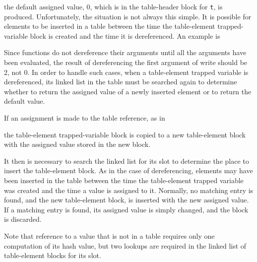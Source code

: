 
\noindent the default assigned value, 0, which is in the table-header
block for \texttt{t}, is produced. Unfortunately, the situation is not
always this simple. It is possible for elements to be inserted in a
table between the time the table-element trapped-variable block is
created and the time it is dereferenced. An example is


Since functions do not dereference their arguments until all the
arguments have been evaluated, the result of dereferencing the first
argument of write should be 2, not 0. In order to handle such cases,
when a table-element trapped variable is dereferenced, its linked list
in the table must be searched again to determine whether to return the
assigned value of a newly inserted element or to return the default
value.

If an assignment is made to the table reference, as in


\noindent the table-element trapped-variable block is copied to a new
table-element block with the assigned value stored in the new block.

It then is necessary to search the linked list for its slot to %
determine the place to insert the table-element block. As in the case
of dereferencing, elements may have been inserted in the table between
the time the table-element trapped variable was created and the time a
value is assigned to it. Normally, no matching entry is found, and the
new table-element
block, is inserted with the new assigned value.  If a matching entry
is found, its assigned value is simply changed, and the block is
discarded.

Note that reference to a value that is not in a table requires only
one computation of its hash value, but two lookups are required in the
linked list of table-element blocks for its slot.


